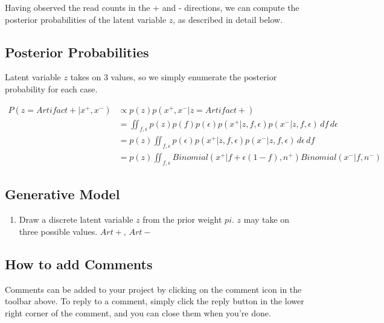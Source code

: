\documentclass[a4paper]{article}
\begin{document}
Having observed the read counts in the + and - directions, we can compute the posterior probabilities of the latent variable $z$, as described in detail below.

\subsection{Posterior Probabilities}

Latent variable $z$ takes on 3 values, so we simply enumerate the posterior probability for each case.

\begin{equation}
\begin{split}
P(z=Artifact+ |x^+, x^-) & \propto p(z) p(x^+, x^- | z=Artifact+) \\
                     & = \iint_{f, \epsilon} p(z) p(f) p(\epsilon) p(x^+ | z, f, \epsilon) p(x^- | z, f, \epsilon) \,df\,d\epsilon \\
                     & = p(z) \iint_{f, \epsilon} p(\epsilon) p(x^+ | z, f, \epsilon) p(x^- | z, f, \epsilon) \, d\epsilon  \, df \\
                     & = p(z) \iint_{f, \epsilon} Binomial(x^+ | f + \epsilon(1-f), n^+) Binomial(x^- | f, n^-)    
\end{split}
\end{equation}

\subsection{Generative Model}

\begin{enumerate}
\item Draw a discrete latent variable $z$ from the prior weight $pi$. $z$ may take on three possible values. $Art+$, $Art-$
\end{enumerate}





\subsection{How to add Comments}

Comments can be added to your project by clicking on the comment icon in the toolbar above. %
%
%
To reply to a comment, simply click the reply button in the lower right corner of the comment, and you can close them when you're done.
\end{document}
